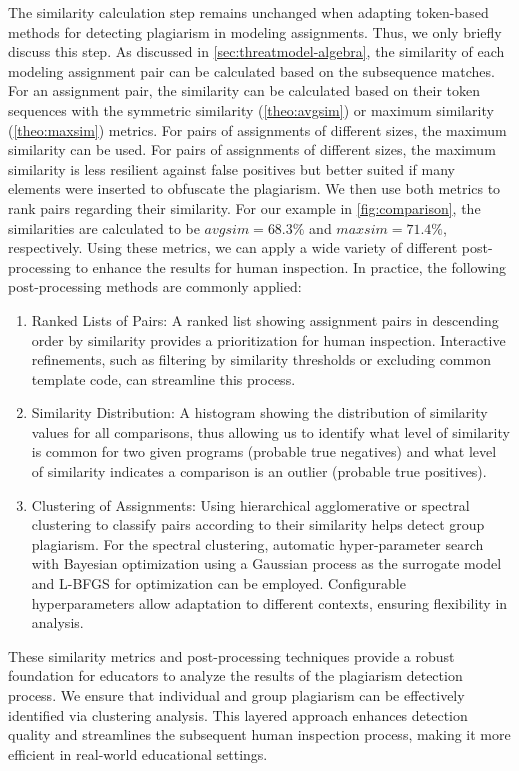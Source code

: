 \noindent
The similarity calculation step remains unchanged when adapting token-based methods for detecting plagiarism in modeling assignments. Thus, we only briefly discuss this step.
As discussed in \autoref{sec:threatmodel-algebra}, the similarity of each modeling assignment pair can be calculated based on the subsequence matches.
For an assignment pair, the similarity can be calculated based on their token sequences with the symmetric similarity (\autoref{theo:avgsim}) or maximum similarity (\autoref{theo:maxsim}) metrics.
For pairs of assignments of different sizes, the maximum similarity can be used.
For pairs of assignments of different sizes, the maximum similarity is less resilient against false positives but better suited if many elements were inserted to obfuscate the plagiarism. We then use both metrics to rank pairs regarding their similarity. For our example in \autoref{fig:comparison}, the similarities are calculated to be $avgsim = 68.3\%$ and $maxsim = 71.4\%$, respectively.
%
Using these metrics, we can apply a wide variety of different post-processing to enhance the results for human inspection.
In practice, the following post-processing methods are commonly applied:
\begin{enumerate}[leftmargin=*]
    \item Ranked Lists of Pairs: A ranked list showing assignment pairs in descending order by similarity provides a prioritization for human inspection. Interactive refinements, such as filtering by similarity thresholds or excluding common template code, can streamline this process.
    \item Similarity Distribution: A histogram showing the distribution of similarity values for all comparisons, thus allowing us to identify what level of similarity is common for two given programs (probable true negatives) and what level of similarity indicates a comparison is an outlier (probable true positives).
    \item Clustering of Assignments: Using hierarchical agglomerative or spectral clustering to classify pairs according to their similarity helps detect group plagiarism.
    For the spectral clustering, automatic hyper-parameter search with Bayesian optimization using a Gaussian process as the surrogate model and L-BFGS for optimization \citet{Ng2001} can be employed. Configurable hyperparameters allow adaptation to different contexts, ensuring flexibility in analysis.
\end{enumerate}

These similarity metrics and post-processing techniques provide a robust foundation for educators to analyze the results of the plagiarism detection process. We ensure that individual and group plagiarism can be effectively identified via clustering analysis. This layered approach enhances detection quality and streamlines the subsequent human inspection process, making it more efficient in real-world educational settings.

